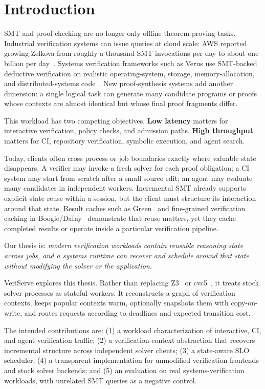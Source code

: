 \documentclass[10pt,twocolumn]{article}
\begin{document}
\section{Introduction}
SMT and proof checking are no longer only offline theorem-proving tasks. Industrial verification systems can issue queries at cloud scale: AWS reported growing Zelkova from roughly a thousand SMT invocations per day to about one billion per day~\cite{rungta2022billion}. Systems verification frameworks such as Verus use SMT-backed deductive verification on realistic operating-system, storage, memory-allocation, and distributed-systems code~\cite{lattuada2024verus}. New proof-synthesis systems add another dimension: a single logical task can generate many candidate programs or proofs whose contexts are almost identical but whose final proof fragments differ.

This workload has two competing objectives. \textbf{Low latency} matters for interactive verification, policy checks, and admission paths. \textbf{High throughput} matters for CI, repository verification, symbolic execution, and agent search.

Today, clients often cross process or job boundaries exactly where valuable state disappears. A verifier may invoke a fresh solver for each proof obligation; a CI system may start from scratch after a small source edit; an agent may evaluate many candidates in independent workers. Incremental SMT already supports explicit state reuse within a session, but the client must structure its interaction around that state. Result caches such as Green~\cite{visser2012green} and fine-grained verification caching in Boogie/Dafny~\cite{leino2015caching} demonstrate that reuse matters, yet they cache completed results or operate inside a particular verification pipeline.

Our thesis is: \emph{modern verification workloads contain reusable reasoning state across jobs, and a systems runtime can recover and schedule around that state without modifying the solver or the application.}

VeriServe explores this thesis. Rather than replacing Z3~\cite{demoura2008z3} or cvc5~\cite{barbosa2022cvc5}, it treats stock solver processes as stateful workers. It reconstructs a graph of verification contexts, keeps popular contexts warm, optionally snapshots them with copy-on-write, and routes requests according to deadlines and expected transition cost.

The intended contributions are: (1) a workload characterization of interactive, CI, and agent verification traffic; (2) a verification-context abstraction that recovers incremental structure across independent solver clients; (3) a state-aware SLO scheduler; (4) a transparent implementation for unmodified verification frontends and stock solver backends; and (5) an evaluation on real systems-verification workloads, with unrelated SMT queries as a negative control.
\end{document}
